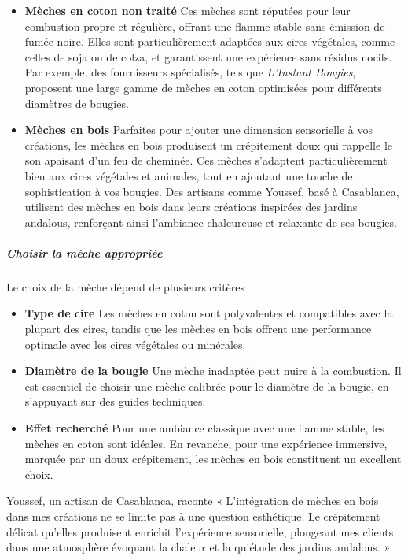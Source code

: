\documentclass[11pt,fleqn,onecolumn,oneside]{book}
\begin{document}
\begin{itemize}
    \item \textbf{Mèches en coton non traité} Ces mèches sont réputées pour leur combustion propre et régulière, offrant une flamme stable sans émission de fumée noire. Elles sont particulièrement adaptées aux cires végétales, comme celles de soja ou de colza, et garantissent une expérience sans résidus nocifs. Par exemple, des fournisseurs spécialisés, tels que \textit{L’Instant Bougies}, proposent une large gamme de mèches en coton optimisées pour différents diamètres de bougies.
    
    \item \textbf{Mèches en bois} Parfaites pour ajouter une dimension sensorielle à vos créations, les mèches en bois produisent un crépitement doux qui rappelle le son apaisant d’un feu de cheminée. Ces mèches s’adaptent particulièrement bien aux cires végétales et animales, tout en ajoutant une touche de sophistication à vos bougies. Des artisans comme Youssef, basé à Casablanca, utilisent des mèches en bois dans leurs créations inspirées des jardins andalous, renforçant ainsi l’ambiance chaleureuse et relaxante de ses bougies.
\end{itemize}

\subparagraph{Choisir la mèche appropriée} Le choix de la mèche dépend de plusieurs critères
\begin{itemize}
    \item \textbf{Type de cire} Les mèches en coton sont polyvalentes et compatibles avec la plupart des cires, tandis que les mèches en bois offrent une performance optimale avec les cires végétales ou minérales.
    \item \textbf{Diamètre de la bougie} Une mèche inadaptée peut nuire à la combustion. Il est essentiel de choisir une mèche calibrée pour le diamètre de la bougie, en s’appuyant sur des guides techniques.
    \item \textbf{Effet recherché} Pour une ambiance classique avec une flamme stable, les mèches en coton sont idéales. En revanche, pour une expérience immersive, marquée par un doux crépitement, les mèches en bois constituent un excellent choix.
\end{itemize}

\begin{example}
Youssef, un artisan de Casablanca, raconte « L’intégration de mèches en bois dans mes créations ne se limite pas à une question esthétique. Le crépitement délicat qu’elles produisent enrichit l’expérience sensorielle, plongeant mes clients dans une atmosphère évoquant la chaleur et la quiétude des jardins andalous. »
\end{example}
\end{document}
